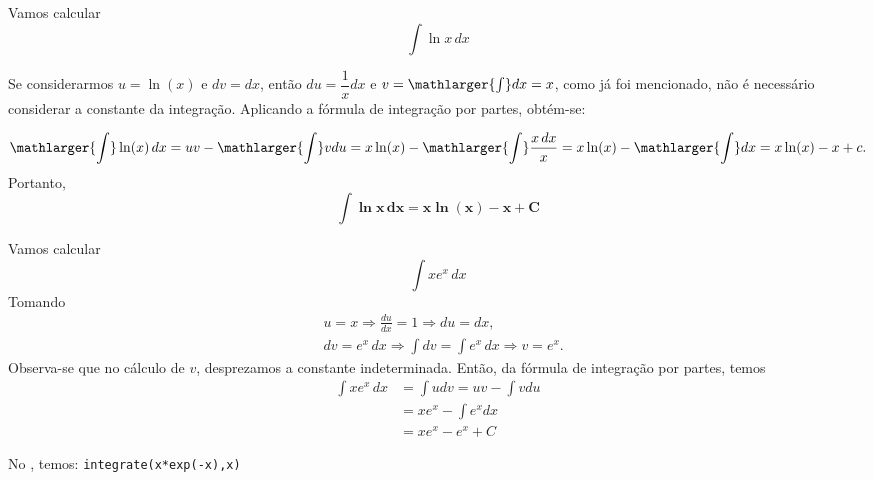 \cleardoublepage\documentclass[../main.tex]{subfiles}
\begin{document}
\begin{ex}\label{ExDem:Int-lnx}
Vamos calcular
\begin{equation*}
  \int \ln x\,dx
\end{equation*}

\begin{solution}
Se considerarmos \(u=\ln (x)\) e \(dv=dx\), então \(du=\dfrac{1}{x}dx \) e \(v=\mathlarger{\int} dx =x\), como já foi mencionado, não é necessário considerar a constante da integração. Aplicando a fórmula de integração por partes, obtém-se:

\[ \mathlarger{\int} \ln (x) \,dx = uv-\mathlarger{\int} v du= x\ln (x) - \mathlarger{\int} \dfrac{x\,dx}{x} = x\ln (x) - \mathlarger{\int} dx= x \ln (x) -x +c. \]
Portanto,
\begin{equation}\label{eq:int_lnx}
  \boldsymbol{\int \ln x \,dx = x\ln(x) - x + C}
\end{equation}
\end{solution}
\end{ex}

\begin{ex}
  Vamos calcular
  \begin{equation*}
    \int xe^x\,dx
  \end{equation*}
  Tomando
  \begin{align*}
    &u = x \Rightarrow \frac{du}{dx} = 1 \Rightarrow du = dx,\\
    &dv = e^x\,dx \Rightarrow \int dv = \int e^x\,dx \Rightarrow v = e^x.
  \end{align*}
  Observa-se que no cálculo de $v$, desprezamos a constante indeterminada. Então, da fórmula de integração por partes, temos
  \begin{align*}
    \int xe^x\,dx &= \int udv = uv - \int vdu \\
                  &= xe^x - \int e^xdx \\
                  &= xe^x - e^x + C
  \end{align*}
  
  
  No \geogebra, temos: \verb|integrate(x*exp(-x),x)|
\end{ex}
\end{document}
